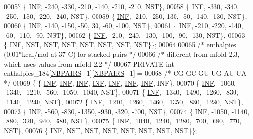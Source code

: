 \begin{DoxyCode}
00057   \{  \hyperlink{constants_8h_a12c2040f25d8e3a7b9e1c2024c618cb6}{INF},  -240,  -330,  -210,  -140,  -210,  -210, NST\},
00058   \{  \hyperlink{constants_8h_a12c2040f25d8e3a7b9e1c2024c618cb6}{INF},  -330,  -340,  -250,  -150,  -220,  -240, NST\},
00059   \{  \hyperlink{constants_8h_a12c2040f25d8e3a7b9e1c2024c618cb6}{INF},  -210,  -250,   130,   -50,  -140,  -130, NST\},
00060   \{  \hyperlink{constants_8h_a12c2040f25d8e3a7b9e1c2024c618cb6}{INF},  -140,  -150,   -50,    30,   -60,  -100, NST\},
00061   \{  \hyperlink{constants_8h_a12c2040f25d8e3a7b9e1c2024c618cb6}{INF},  -210,  -220,  -140,   -60,  -110,   -90, NST\},
00062   \{  \hyperlink{constants_8h_a12c2040f25d8e3a7b9e1c2024c618cb6}{INF},  -210,  -240,  -130,  -100,   -90,  -130, NST\},
00063   \{  \hyperlink{constants_8h_a12c2040f25d8e3a7b9e1c2024c618cb6}{INF},   NST,   NST,   NST,   NST,   NST,   NST, NST\}\};
00064 
00065 \textcolor{comment}{/* enthalpies (0.01*kcal/mol at 37 C) for stacked pairs */}
00066 \textcolor{comment}{/* different from mfold-2.3, which uses values from mfold-2.2 */}
00067 PRIVATE \textcolor{keywordtype}{int} enthalpies\_184[\hyperlink{constants_8h_a5e75221c779d618eab81e096f37e32ce}{NBPAIRS}+1][\hyperlink{constants_8h_a5e75221c779d618eab81e096f37e32ce}{NBPAIRS}+1] =
00068 \textcolor{comment}{/*          CG     GC     GU     UG     AU     UA  */}
00069 \{ \{  \hyperlink{constants_8h_a12c2040f25d8e3a7b9e1c2024c618cb6}{INF},   \hyperlink{constants_8h_a12c2040f25d8e3a7b9e1c2024c618cb6}{INF},   \hyperlink{constants_8h_a12c2040f25d8e3a7b9e1c2024c618cb6}{INF},   \hyperlink{constants_8h_a12c2040f25d8e3a7b9e1c2024c618cb6}{INF},   \hyperlink{constants_8h_a12c2040f25d8e3a7b9e1c2024c618cb6}{INF},   \hyperlink{constants_8h_a12c2040f25d8e3a7b9e1c2024c618cb6}{INF},   \hyperlink{constants_8h_a12c2040f25d8e3a7b9e1c2024c618cb6}{INF}, INF\},
00070   \{  \hyperlink{constants_8h_a12c2040f25d8e3a7b9e1c2024c618cb6}{INF}, -1060, -1340, -1210,  -560, -1050, -1040, NST\},
00071   \{  \hyperlink{constants_8h_a12c2040f25d8e3a7b9e1c2024c618cb6}{INF}, -1340, -1490, -1260,  -830, -1140, -1240, NST\},
00072   \{  \hyperlink{constants_8h_a12c2040f25d8e3a7b9e1c2024c618cb6}{INF}, -1210, -1260, -1460, -1350,  -880, -1280, NST\},
00073   \{  \hyperlink{constants_8h_a12c2040f25d8e3a7b9e1c2024c618cb6}{INF},  -560,  -830, -1350,  -930,  -320,  -700, NST\},
00074   \{  \hyperlink{constants_8h_a12c2040f25d8e3a7b9e1c2024c618cb6}{INF}, -1050, -1140,  -880,  -320,  -940,  -680, NST\},
00075   \{  \hyperlink{constants_8h_a12c2040f25d8e3a7b9e1c2024c618cb6}{INF}, -1040, -1240, -1280,  -700,  -680,  -770, NST\},
00076   \{  \hyperlink{constants_8h_a12c2040f25d8e3a7b9e1c2024c618cb6}{INF},   NST,   NST,   NST,   NST,   NST,   NST, NST\}\};

\end{DoxyCode}
